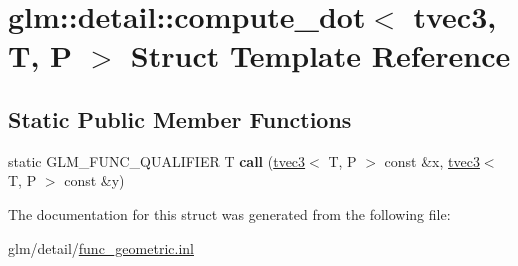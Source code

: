 \hypertarget{structglm_1_1detail_1_1compute__dot_3_01tvec3_00_01T_00_01P_01_4}{\section{glm\-:\-:detail\-:\-:compute\-\_\-dot$<$ tvec3, T, P $>$ Struct Template Reference}
\label{structglm_1_1detail_1_1compute__dot_3_01tvec3_00_01T_00_01P_01_4}
}
\subsection*{Static Public Member Functions}
\begin{DoxyCompactItemize}
\item 
\hypertarget{structglm_1_1detail_1_1compute__dot_3_01tvec3_00_01T_00_01P_01_4_afab12cf4d0dd0e1033fc17fd4dd53da8}{static G\-L\-M\-\_\-\-F\-U\-N\-C\-\_\-\-Q\-U\-A\-L\-I\-F\-I\-E\-R T {\bfseries call} (\hyperlink{structglm_1_1tvec3}{tvec3}$<$ T, P $>$ const \&x, \hyperlink{structglm_1_1tvec3}{tvec3}$<$ T, P $>$ const \&y)}\label{structglm_1_1detail_1_1compute__dot_3_01tvec3_00_01T_00_01P_01_4_afab12cf4d0dd0e1033fc17fd4dd53da8}

\end{DoxyCompactItemize}


The documentation for this struct was generated from the following file\-:\begin{DoxyCompactItemize}
\item 
glm/detail/\hyperlink{func__geometric_8inl}{func\-\_\-geometric.\-inl}\end{DoxyCompactItemize}
